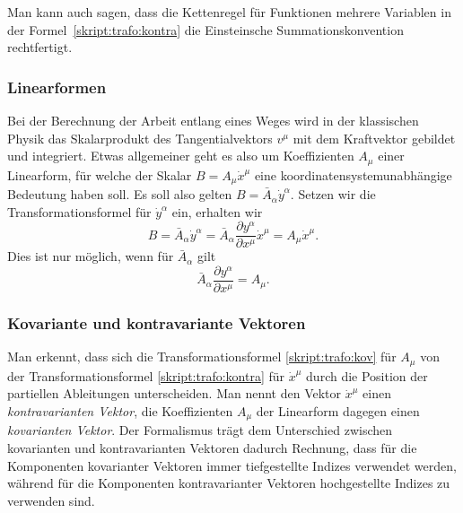 Man kann auch sagen, dass die Kettenregel für Funktionen mehrere Variablen
in der Formel~\eqref{skript:trafo:kontra}
die Einsteinsche Summationskonvention rechtfertigt.

\subsubsection{Linearformen}
%
Bei der Berechnung der Arbeit entlang eines Weges wird in der klassischen
Physik das Skalarprodukt des Tangentialvektors $v^\mu$ mit dem Kraftvektor
gebildet und integriert.
Etwas allgemeiner geht es also um Koeffizienten $A_\mu$ einer Linearform,
für welche der Skalar $B=A_\mu\dot x^\mu$ eine koordinatensystemunabhängige
Bedeutung haben soll.
%
Es soll also gelten
$B=\bar A_\alpha \dot y^\alpha$.
Setzen wir die Transformationsformel für $\dot y^\alpha$ ein, erhalten
wir
\begin{equation}
B=\bar A_\alpha\dot y^\alpha
=
\bar A_\alpha \frac{\partial y^\alpha}{\partial x^\mu}\dot x^\mu
=
A_\mu\dot x^\mu.
\end{equation}
Dies ist nur möglich, wenn für $\bar A_\alpha$ gilt
\begin{equation}
\bar A_\alpha \frac{\partial y^\alpha}{\partial x^\mu}
= 
A_\mu.
\label{skript:trafo:kov}
\end{equation}

\subsubsection{Kovariante und kontravariante Vektoren}
Man erkennt, dass sich die Transformationsformel \eqref{skript:trafo:kov}
für $A_\mu$ von der Transformationsformel \eqref{skript:trafo:kontra}
für $\dot x^\mu$ durch die Position der partiellen Ableitungen unterscheiden.
Man nennt den Vektor $\dot x^\mu$ einen {\em kontravarianten Vektor},
%
%
die Koeffizienten $A_\mu$ der Linearform dagegen einen {\em kovarianten Vektor}.
%
%
Der Formalismus trägt dem Unterschied zwischen kovarianten und kontravarianten
Vektoren dadurch Rechnung, dass für die Komponenten kovarianter Vektoren
immer tiefgestellte Indizes verwendet werden, während für die Komponenten
kontravarianter Vektoren hochgestellte Indizes zu verwenden sind.

